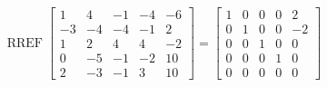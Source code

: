 \begin{exerciseAnswer} 


\[\operatorname{RREF} \left[\begin{array}{ccccc}
1 & 4 & -1 & -4 & -6 \\
-3 & -4 & -4 & -1 & 2 \\
1 & 2 & 4 & 4 & -2 \\
0 & -5 & -1 & -2 & 10 \\
2 & -3 & -1 & 3 & 10
\end{array}\right] = \left[\begin{array}{ccccc}
1 & 0 & 0 & 0 & 2 \\
0 & 1 & 0 & 0 & -2 \\
0 & 0 & 1 & 0 & 0 \\
0 & 0 & 0 & 1 & 0 \\
0 & 0 & 0 & 0 & 0
\end{array}\right] \]



\end{exerciseAnswer}
